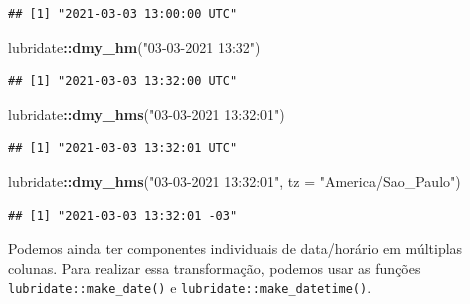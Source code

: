 \documentclass[
]{article}
\newenvironment{Shaded}{\begin{snugshade}}{\end{snugshade}}
\newcommand{\AttributeTok}[1]{\textcolor[rgb]{0.13,0.29,0.53}{#1}}
\newcommand{\FunctionTok}[1]{\textcolor[rgb]{0.13,0.29,0.53}{\textbf{#1}}}
\newcommand{\NormalTok}[1]{#1}
\newcommand{\SpecialCharTok}[1]{\textcolor[rgb]{0.81,0.36,0.00}{\textbf{#1}}}
\newcommand{\StringTok}[1]{\textcolor[rgb]{0.31,0.60,0.02}{#1}}
\begin{document}
\begin{verbatim}
## [1] "2021-03-03 13:00:00 UTC"
\end{verbatim}

\begin{Shaded}
\begin{Highlighting}[]
\NormalTok{lubridate}\SpecialCharTok{::}\FunctionTok{dmy\_hm}\NormalTok{(}\StringTok{"03{-}03{-}2021 13:32"}\NormalTok{)}
\end{Highlighting}
\end{Shaded}

\begin{verbatim}
## [1] "2021-03-03 13:32:00 UTC"
\end{verbatim}

\begin{Shaded}
\begin{Highlighting}[]
\NormalTok{lubridate}\SpecialCharTok{::}\FunctionTok{dmy\_hms}\NormalTok{(}\StringTok{"03{-}03{-}2021 13:32:01"}\NormalTok{)}
\end{Highlighting}
\end{Shaded}

\begin{verbatim}
## [1] "2021-03-03 13:32:01 UTC"
\end{verbatim}

\begin{Shaded}
\begin{Highlighting}[]
\NormalTok{lubridate}\SpecialCharTok{::}\FunctionTok{dmy\_hms}\NormalTok{(}\StringTok{"03{-}03{-}2021 13:32:01"}\NormalTok{, }\AttributeTok{tz =} \StringTok{"America/Sao\_Paulo"}\NormalTok{)}
\end{Highlighting}
\end{Shaded}

\begin{verbatim}
## [1] "2021-03-03 13:32:01 -03"
\end{verbatim}

Podemos ainda ter componentes individuais de data/horário em múltiplas colunas. Para realizar essa transformação, podemos usar as funções \texttt{lubridate::make\_date()} e \texttt{lubridate::make\_datetime()}.
\end{document}
